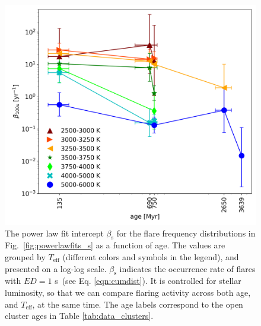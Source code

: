 \documentclass{aa}
\begin{document}
\begin{figure}[ht!]
    \centering
    \includegraphics[width=\hsize]{pics/FFDs/beta_T_age_ED_wheatland.png}
    \caption{The power law fit intercept $\beta_\mathrm{s}$ for the flare frequency distributions in Fig.~\ref{fig:powerlawfits_s} as a function of age. The values are grouped by $T_\mathrm{eff}$ (different colors and symbols in the legend), and presented on a log-log scale. $\beta_\mathrm{s}$ indicates the occurrence rate of flares with $ED=1$ s~(see Eq. \ref{eqn:cumdist}). It is controlled for stellar luminosity, so that we can compare flaring activity across both age, and $T_\mathrm{eff}$, at the same time. The age labels correspond to the open cluster ages in Table \ref{tab:data_clusters}.}    	
    \label{fig:beta_T_age}
\end{figure}
\end{document}
